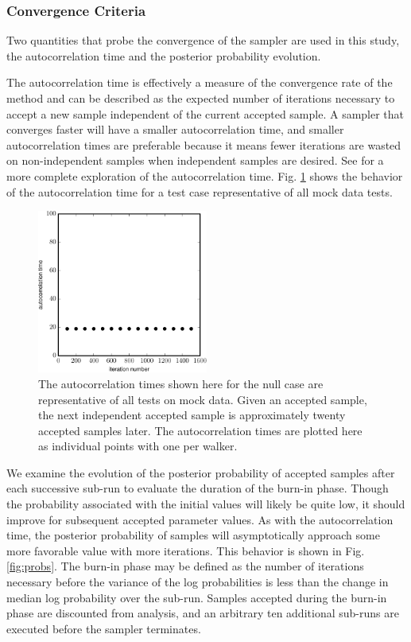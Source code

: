 \documentclass[preprint]{aastex}
\begin{document}
\clearpage
\subsubsection{Convergence Criteria}
\label{sec:acorr}

Two quantities that probe the convergence of the sampler are used in this 
study, the autocorrelation time and the posterior probability evolution.

The autocorrelation time is effectively a measure of the convergence rate of 
the method and can be described as the expected number of iterations necessary 
to accept a new sample independent of the current accepted sample.  A sampler 
that converges faster will have a smaller autocorrelation time, and smaller 
autocorrelation times are preferable because it means fewer iterations are 
wasted on non-independent samples when independent samples are desired.  See 
\citet{Foreman-Mackey2013} for a more complete exploration of the 
autocorrelation time.  Fig. \ref{fig:acorr} shows the behavior of the 
autocorrelation time for a test case representative of all mock data tests.

\begin{figure}
\includegraphics[width=0.5\textwidth]{figs/null/times.pdf}
\caption{The autocorrelation times shown here for the null case are 
representative of all tests on mock data.  Given an accepted sample, the next 
independent accepted sample is approximately twenty accepted samples later.  
The autocorrelation times are plotted here as individual points with one per 
walker.}
\label{fig:acorr}
\end{figure}

We examine the evolution of the posterior probability of accepted samples after 
each successive sub-run to evaluate the duration of the burn-in phase.  Though 
the probability associated with the initial values will likely be quite low, it 
should improve for subsequent accepted parameter values.  As with the 
autocorrelation time, the posterior probability of samples will asymptotically 
approach some more favorable value with more iterations.  This behavior is 
shown in Fig. \ref{fig:probs}.  The burn-in phase may be defined as the number 
of iterations necessary before the variance of the log probabilities is less 
than the change in median log probability over the sub-run.  Samples accepted 
during the burn-in phase are discounted from analysis, and an arbitrary ten 
additional sub-runs are executed before the sampler terminates.  
\end{document}
